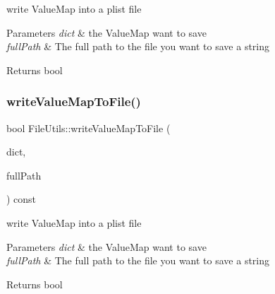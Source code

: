 write Value\+Map into a plist file


\begin{DoxyParams}{Parameters}
{\em dict} & the Value\+Map want to save \\
\hline
{\em full\+Path} & The full path to the file you want to save a string \\
\hline
\end{DoxyParams}
\begin{DoxyReturn}{Returns}
bool 
\end{DoxyReturn}
\mbox{\label{classFileUtils_a19a124d3a50e5dcd1f4d93eb4799af6e}} 
\subsubsection{\texorpdfstring{write\+Value\+Map\+To\+File()}{writeValueMapToFile()}\hspace{0.1cm}{\footnotesize\ttfamily [2/3]}}
{\footnotesize\ttfamily bool File\+Utils\+::write\+Value\+Map\+To\+File (\begin{DoxyParamCaption}\item[{const Value\+Map \&}]{dict,  }\item[{const std\+::string \&}]{full\+Path }\end{DoxyParamCaption}) const\hspace{0.3cm}{\ttfamily [virtual]}}

write Value\+Map into a plist file


\begin{DoxyParams}{Parameters}
{\em dict} & the Value\+Map want to save \\
\hline
{\em full\+Path} & The full path to the file you want to save a string \\
\hline
\end{DoxyParams}
\begin{DoxyReturn}{Returns}
bool 
\end{DoxyReturn}
\mbox{\label{classFileUtils_a8efadc41f2a123969a3bd9ee5ae35ec9}} 
